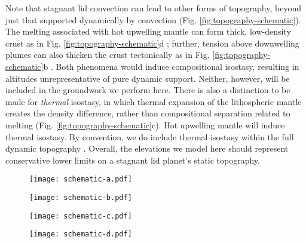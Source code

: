 Note that stagnant lid convection can lead to other forms of topography, beyond just that supported dynamically by convection (Fig. \ref{fig:topography-schematic}). The melting associated with hot upwelling mantle can form thick, low-density crust as in Fig. \ref{fig:topography-schematic}d \citep{stofan_large_1995}; further, tension above downwelling plumes can also thicken the crust tectonically as in Fig. \ref{fig:topography-schematic}b \citep{kiefer_mantle_1991,pysklywec_timedependent_2003, zampa_evidence_2018}. Both phenomena would induce compositional isostasy, resulting in altitudes unrepresentative of pure dynamic support. Neither, however, will be included in the groundwork we perform here. There is also a distinction to be made for \textit{thermal} isostasy, in which thermal expansion of the lithospheric mantle creates the density difference, rather than compositional separation related to melting (Fig. \ref{fig:topography-schematic}c). Hot upwelling mantle will induce thermal isostasy. By convention, we do include thermal isostasy within the full dynamic topography \citep[see][]{molnar_mantle_2015, hoggard_observational_2021}. Overall, the elevations we model here should represent conservative lower limits on a stagnant lid planet's static topography.

\begin{figure*}
  \centering
  \begin{subfigure}[b]{0.5\textwidth}
    \texttt{[image: schematic-a.pdf]}
    \caption{}
    \label{fig:schematic-a}   
  \end{subfigure}  
  \hfill           
  \begin{subfigure}[b]{0.5\textwidth}
    \texttt{[image: schematic-b.pdf]}
    \caption{}
    \label{fig:schematic-b}
  \end{subfigure}     %
           
  \begin{subfigure}[b]{0.5\textwidth}
    \texttt{[image: schematic-c.pdf]}
    \caption{}
    \label{fig:schematic-c}
  \end{subfigure}
  \hfill
    \begin{subfigure}[b]{0.5\textwidth}
    \texttt{[image: schematic-d.pdf]}
    \caption{}
    \label{fig:schematic-d}
  \end{subfigure}
  \caption[The four major endogenic sources of topography on a stagnant lid planet.]{The four major endogenic sources of topography on a stagnant lid planet. \textit{(a)} The component of dynamic topography due to flow-induced traction on the lithosphere. \textit{(b)} Tectonic crustal thickening caused by tension over cold downwellings. \textit{(c)} The component of dynamic topography due to thermal isostasy over thinned lithosphere. \textit{(d)} Magmatic crustal thickening caused by melting of upwelling plumes.}
  \label{fig:topography-schematic}
\end{figure*}




